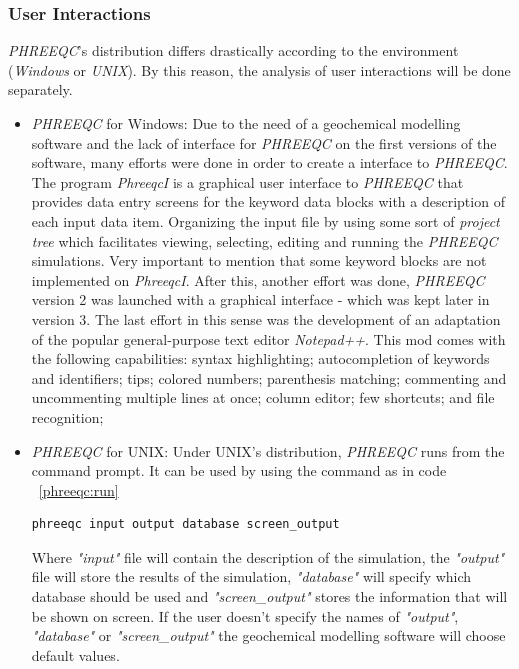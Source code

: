 \documentclass[ppgc,mestrado,english]{iiufrgs}
\begin{document}
\subsubsection{User Interactions}
\emph{PHREEQC}'s distribution differs drastically according to the environment (\emph{Windows} or \emph{UNIX}). By this reason, the analysis of user interactions will be done separately.
\begin{itemize}
\item \emph{PHREEQC} for Windows: Due to the need of a geochemical modelling software and the lack of interface for \emph{PHREEQC} on the first versions of the software, many efforts were done in order to create a interface to \emph{PHREEQC}. The program \emph{PhreeqcI} is a graphical user interface to \emph{PHREEQC} that provides data entry screens for the keyword data blocks with a description of each input data item. Organizing the input file by using some sort of \emph{project tree} which facilitates viewing, selecting, editing and running the \emph{PHREEQC} simulations. Very important to mention that some keyword blocks are not implemented on \emph{PhreeqcI}. After this, another effort was done, \emph{PHREEQC} version 2 was launched with a graphical interface - which was kept later in version 3. The last effort in this sense was the development of an adaptation of the popular general-purpose text editor \emph{Notepad++}. This mod comes with the following capabilities: syntax highlighting; autocompletion of keywords and identifiers; tips; colored numbers; parenthesis matching; commenting and uncommenting multiple lines at once; column editor; few shortcuts; and file recognition;
\item \emph{PHREEQC} for UNIX: Under UNIX's distribution, \emph{PHREEQC} runs from the command prompt. It can be used by using the command as in code ~\ref{phreeqc:run}
\begin{lstlisting}[frame=single, caption=Command to run UNIX's \emph{PHREEQC}, label=phreeqc:run]
phreeqc input output database screen_output
\end{lstlisting}
Where \emph{"input"} file will contain the description of the simulation, the \emph{"output"} file will store the results of the simulation, \emph{"database"} will specify which database should be used and \emph{"screen\_output"} stores the information that will be shown on screen. If the user doesn't specify the names of \emph{"output"}, \emph{"database"} or \emph{"screen\_output"} the geochemical modelling software will choose default values.

\end{itemize}
\end{document}
